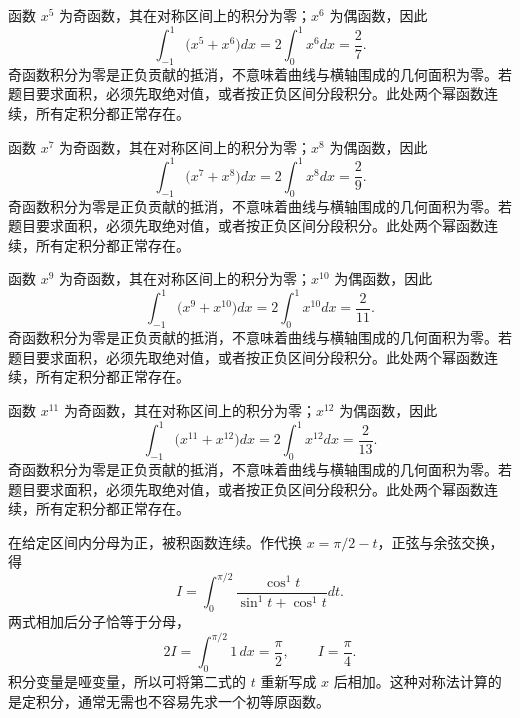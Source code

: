 \documentclass[UTF8,12pt,a4paper,fontset=fandol]{ctexart}
\begin{document}
\begin{solve}\label{ans:c17q17}
函数 $x^{5}$ 为奇函数，其在对称区间上的积分为零；$x^{6}$ 为偶函数，因此
\[
\int_{-1}^1\bigl(x^{5}+x^{6}\bigr)dx=2\int_0^1x^{6}dx=\frac{2}{7}.
\]
奇函数积分为零是正负贡献的抵消，不意味着曲线与横轴围成的几何面积为零。若题目要求面积，必须先取绝对值，或者按正负区间分段积分。此处两个幂函数连续，所有定积分都正常存在。
\end{solve}

\begin{solve}\label{ans:c17q18}
函数 $x^{7}$ 为奇函数，其在对称区间上的积分为零；$x^{8}$ 为偶函数，因此
\[
\int_{-1}^1\bigl(x^{7}+x^{8}\bigr)dx=2\int_0^1x^{8}dx=\frac{2}{9}.
\]
奇函数积分为零是正负贡献的抵消，不意味着曲线与横轴围成的几何面积为零。若题目要求面积，必须先取绝对值，或者按正负区间分段积分。此处两个幂函数连续，所有定积分都正常存在。
\end{solve}

\begin{solve}\label{ans:c17q19}
函数 $x^{9}$ 为奇函数，其在对称区间上的积分为零；$x^{10}$ 为偶函数，因此
\[
\int_{-1}^1\bigl(x^{9}+x^{10}\bigr)dx=2\int_0^1x^{10}dx=\frac{2}{11}.
\]
奇函数积分为零是正负贡献的抵消，不意味着曲线与横轴围成的几何面积为零。若题目要求面积，必须先取绝对值，或者按正负区间分段积分。此处两个幂函数连续，所有定积分都正常存在。
\end{solve}

\begin{solve}\label{ans:c17q20}
函数 $x^{11}$ 为奇函数，其在对称区间上的积分为零；$x^{12}$ 为偶函数，因此
\[
\int_{-1}^1\bigl(x^{11}+x^{12}\bigr)dx=2\int_0^1x^{12}dx=\frac{2}{13}.
\]
奇函数积分为零是正负贡献的抵消，不意味着曲线与横轴围成的几何面积为零。若题目要求面积，必须先取绝对值，或者按正负区间分段积分。此处两个幂函数连续，所有定积分都正常存在。
\end{solve}

\begin{solve}\label{ans:c17q21}
在给定区间内分母为正，被积函数连续。作代换 $x=\pi/2-t$，正弦与余弦交换，得
\[
I=\int_0^{\pi/2}\frac{\cos^{1}t}{\sin^{1}t+\cos^{1}t}dt.
\]
两式相加后分子恰等于分母，
\[
2I=\int_0^{\pi/2}1\,dx=\frac\pi2,\qquad I=\frac\pi4.
\]
积分变量是哑变量，所以可将第二式的 $t$ 重新写成 $x$ 后相加。这种对称法计算的是定积分，通常无需也不容易先求一个初等原函数。
\end{solve}
\end{document}
